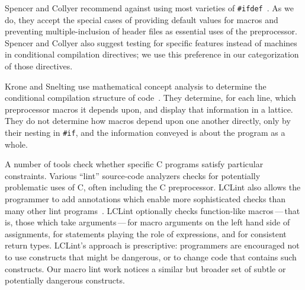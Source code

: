 \documentclass[10pt]{article}
\begin{document}
Spencer and Collyer recommend against using most varieties of
\texttt{\#ifdef}~\cite{SpencerC92}.  As we do, they accept the special
cases of providing default values for macros and preventing
multiple-inclusion of header files as essential uses of the
preprocessor.  Spencer and Collyer also suggest testing for specific
features instead of machines in conditional compilation directives; we
use this preference in our categorization of those directives.

Krone and Snelting use mathematical concept analysis to determine the
conditional compilation structure of code~\cite{Krone94}.  They determine,
for each line, which preprocessor macros it depends upon, and display that
information in a lattice.  They do not determine how macros depend upon one
another directly, only by their nesting in {\tt \#if}, and the information
conveyed is about the program as a whole.  



A number of tools check whether specific C programs satisfy particular
constraints.  Various ``lint'' source-code analyzers checks for
potentially problematic uses of C, often including the C preprocessor.
LCLint also allows the programmer to add annotations which enable more
sophisticated checks than many other lint programs~\cite{Evans-fse94}.
LCLint optionally checks function-like macros\,---\,that is, those which
take arguments\,---\,for macro arguments on the left hand side of
assignments, for statements playing the role of expressions, and for
consistent return types.  LCLint's approach is prescriptive: programmers
are encouraged not to use constructs that might be dangerous, or to
change code that contains such constructs.  Our macro lint work notices
a similar but broader set of subtle or potentially dangerous constructs.
\end{document}
